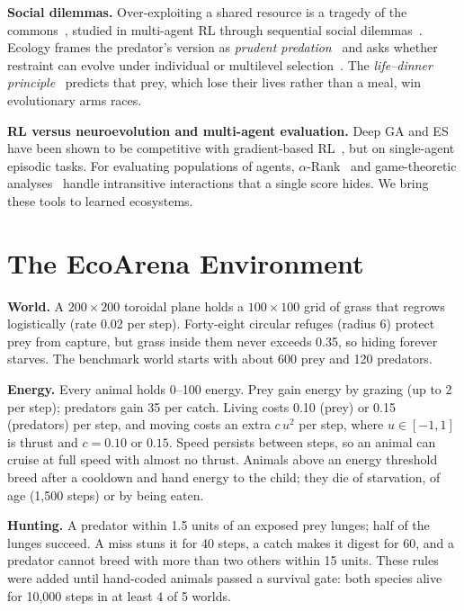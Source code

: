 \documentclass[conference]{IEEEtran}
\begin{document}
\textbf{Social dilemmas.} Over-exploiting a shared resource is a tragedy of the commons~\cite{hardin1968}, studied in multi-agent RL through sequential social dilemmas~\cite{leibo2017,perolat2017}. Ecology frames the predator's version as \emph{prudent predation}~\cite{slobodkin1968} and asks whether restraint can evolve under individual or multilevel selection~\cite{traulsen2006}. The \emph{life--dinner principle}~\cite{dawkins1979} predicts that prey, which lose their lives rather than a meal, win evolutionary arms races.

\textbf{RL versus neuroevolution and multi-agent evaluation.} Deep GA and ES have been shown to be competitive with gradient-based RL~\cite{such2017,salimans2017}, but on single-agent episodic tasks. For evaluating populations of agents, $\alpha$-Rank~\cite{omidshafiei2019} and game-theoretic analyses~\cite{balduzzi2018} handle intransitive interactions that a single score hides. We bring these tools to learned ecosystems.

\section{The EcoArena Environment}

\textbf{World.} A $200\times200$ toroidal plane holds a $100\times100$ grid of grass that regrows logistically (rate 0.02 per step). Forty-eight circular refuges (radius 6) protect prey from capture, but grass inside them never exceeds 0.35, so hiding forever starves. The benchmark world starts with about 600 prey and 120 predators.

\textbf{Energy.} Every animal holds 0--100 energy. Prey gain energy by grazing (up to 2 per step); predators gain 35 per catch. Living costs 0.10 (prey) or 0.15 (predators) per step, and moving costs an extra $c\,u^2$ per step, where $u\in[-1,1]$ is thrust and $c=0.10$ or $0.15$. Speed persists between steps, so an animal can cruise at full speed with almost no thrust. Animals above an energy threshold breed after a cooldown and hand energy to the child; they die of starvation, of age (1,500 steps) or by being eaten.

\textbf{Hunting.} A predator within 1.5 units of an exposed prey lunges; half of the lunges succeed. A miss stuns it for 40 steps, a catch makes it digest for 60, and a predator cannot breed with more than two others within 15 units. These rules were added until hand-coded animals passed a survival gate: both species alive for 10,000 steps in at least 4 of 5 worlds.
\end{document}
